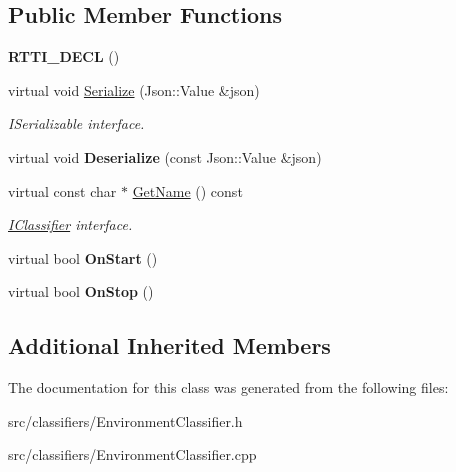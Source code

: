 \subsection*{Public Member Functions}
\begin{DoxyCompactItemize}
\item 
\mbox{\label{class_environment_classifier_aa1100572663bab6bbafedc200608f706}} 
{\bfseries R\+T\+T\+I\+\_\+\+D\+E\+CL} ()
\item 
\mbox{\label{class_environment_classifier_ae5bb06026ec04f98e28678f3d77a08af}} 
virtual void \hyperlink{class_environment_classifier_ae5bb06026ec04f98e28678f3d77a08af}{Serialize} (Json\+::\+Value \&json)
\begin{DoxyCompactList}\small\item\em I\+Serializable interface. \end{DoxyCompactList}\item 
\mbox{\label{class_environment_classifier_a0b931ec5425106247d5ff5778180f836}} 
virtual void {\bfseries Deserialize} (const Json\+::\+Value \&json)
\item 
\mbox{\label{class_environment_classifier_aac33f8bcfc45591b27f3996ca1a722ee}} 
virtual const char $\ast$ \hyperlink{class_environment_classifier_aac33f8bcfc45591b27f3996ca1a722ee}{Get\+Name} () const
\begin{DoxyCompactList}\small\item\em \hyperlink{class_i_classifier}{I\+Classifier} interface. \end{DoxyCompactList}\item 
\mbox{\label{class_environment_classifier_a77159420f0f565b85aa15cdeb9234064}} 
virtual bool {\bfseries On\+Start} ()
\item 
\mbox{\label{class_environment_classifier_a45c9d0b951c667fde24517c7006fd92d}} 
virtual bool {\bfseries On\+Stop} ()
\end{DoxyCompactItemize}
\subsection*{Additional Inherited Members}


The documentation for this class was generated from the following files\+:\begin{DoxyCompactItemize}
\item 
src/classifiers/Environment\+Classifier.\+h\item 
src/classifiers/Environment\+Classifier.\+cpp\end{DoxyCompactItemize}
